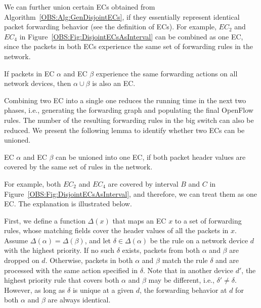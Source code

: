 We can further union certain ECs obtained from Algorithm~\ref{OBS:Alg:GenDisjointECs},
if they essentially represent identical packet forwarding behavior (see the definition of ECs).
For example, $EC_2$ and $EC_4$ in Figure~\ref{OBS:Fig:DisjointECsAsInterval} can be combined as one EC,
since the packets in both ECs experience the same set of forwarding rules in the network.

\begin{lemma}
    If packets in EC $\alpha$ and EC $\beta$ experience the same forwarding actions on all network devices, then $\alpha \cup \beta$ is also an EC.
    \label{OBS:Lemma:MergeFG}
\end{lemma}
Combining two EC into a single one reduces the running time in the next two phases, i.e., generating the forwarding graph and populating the final OpenFlow rules. The number of the resulting forwarding rules in the big switch can also be reduced. We present the following lemma to identify whether two ECs can be unioned.

\begin{lemma}
    EC $\alpha$ and EC $\beta$ can be unioned into one EC, if both packet header values are covered by the same set of rules in the network.
    \label{OBS:Lemma:MergeEC}
\end{lemma}
For example, both $EC_2$ and $EC_4$ are covered by interval $B$ and $C$ in Figure~\ref{OBS:Fig:DisjointECsAsInterval}, and therefore, we can treat them as one EC. The explanation is illustrated below.

First, we define a function $\Delta(x)$ that maps an EC $x$ to a set of forwarding rules, whose matching fields cover the header values of all the packets in $x$. Assume $\Delta(\alpha) = \Delta(\beta)$, and let $\delta \in \Delta(\alpha)$ be the rule on a network device $d$ with the highest priority.
If no such $\delta$ exists, packets from both $\alpha$ and $\beta$ are dropped on $d$.
Otherwise, packets in both $\alpha$ and $\beta$ match the rule $\delta$ and are processed with the same action specified in $\delta$.
Note that in another device $d'$, the highest priority rule that covers both $\alpha$
and $\beta$ may be different, i.e., $\delta' \neq \delta$.
However, as long as $\delta$ is unique at a given $d$, the forwarding behavior at $d$ for both $\alpha$ and $\beta$ are always identical.

